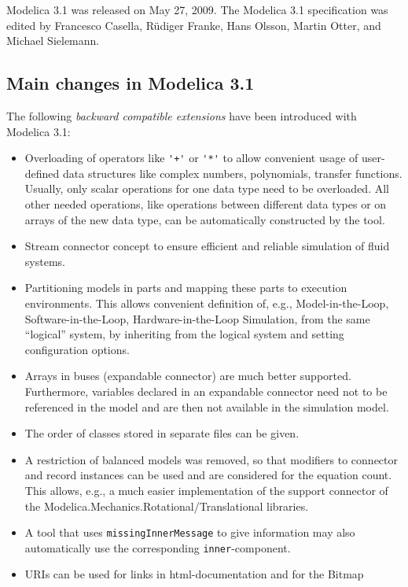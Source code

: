 Modelica 3.1 was released on May 27, 2009. The Modelica 3.1
specification was edited by Francesco Casella, Rüdiger Franke, Hans
Olsson, Martin Otter, and Michael Sielemann.

\subsection{Main changes in Modelica 3.1}\label{main-changes-in-modelica-3-1}

The following \emph{backward compatible extensions} have been introduced with Modelica 3.1:
\begin{itemize}
\item
  Overloading of operators like \lstinline!'+'! or \lstinline!'*'! to allow convenient usage of
  user-defined data structures like complex numbers, polynomials,
  transfer functions. Usually, only scalar operations for one data type
  need to be overloaded. All other needed operations, like operations
  between different data types or on arrays of the new data type, can be
  automatically constructed by the tool.
\item
  Stream connector concept to ensure efficient and reliable simulation
  of fluid systems.
\item
  Partitioning models in parts and mapping these parts to execution
  environments. This allows convenient definition of, e.g.,
  Model-in-the-Loop, Software-in-the-Loop, Hardware-in-the-Loop
  Simulation, from the same ``logical'' system, by inheriting from the
  logical system and setting configuration options.
\item
  Arrays in buses (expandable connector) are much better supported.
  Furthermore, variables declared in an expandable connector need not to
  be referenced in the model and are then not available in the
  simulation model.
\item
  The order of classes stored in separate files can be given.
\item
  A restriction of balanced models was removed, so that modifiers to
  connector and record instances can be used and are considered for the
  equation count. This allows, e.g., a much easier implementation of the
  support connector of the Modelica.Mechanics.Rotational/Translational
  libraries.
\item
  A tool that uses \lstinline!missingInnerMessage! to give information may also automatically use the corresponding \lstinline!inner!-component.
\item
  URIs can be used for links in html-documentation and for the Bitmap

\end{itemize}
